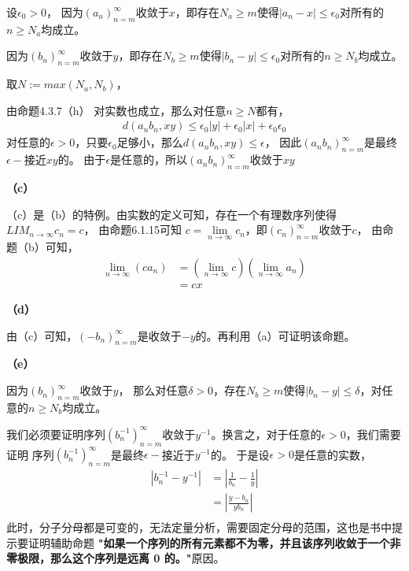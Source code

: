 \documentclass{article}
\theoremstyle{mystyle}
\begin{document}
设$\epsilon_0> 0$，
因为$(a_n)_{n=m}^\infty$收敛于$x$，即存在$N_a \geq m$使得$|a_n - x| \leq \epsilon _0$对所有的$n \geq N_a$均成立。

因为$(b_n)_{n=m}^\infty$收敛于$y$，即存在$N_b \geq m$使得$|b_n - y| \leq \epsilon _0$对所有的$n \geq N_b$均成立。

取$N := max(N_a, N_b)$，

由命题4.3.7（h） 对实数也成立，那么对任意$n \geq N$都有，
\begin{align*}
  d(a_nb_n,xy) \leq \epsilon_0|y| + \epsilon_0|x| + \epsilon_0\epsilon_0
\end{align*}
对任意的$\epsilon > 0$，只要$\epsilon_0$足够小，那么$d(a_nb_n,xy)\leq \epsilon$，
因此$(a_nb_n)_{n=m}^\infty$是最终$\epsilon -$接近$xy$的。
由于$\epsilon$是任意的，所以$(a_nb_n)_{n=m}^\infty$收敛于$xy$


\textbf{（c）}

（c）是（b）的特例。由实数的定义可知，存在一个有理数序列使得$LIM_{n\rightarrow\infty}c_n = c$，
由命题6.1.15可知 $c = \lim\limits_{n \rightarrow \infty}c_n$，即$(c_n)_{n=m}^\infty$收敛于$c$，
由命题（b）可知，
\begin{align*}
  \lim\limits_{n\rightarrow \infty}(ca_n) & = (\lim\limits_{n\rightarrow \infty}c) (\lim\limits_{n\rightarrow \infty}a_n) \\
                                          & = cx
\end{align*}

\textbf{（d）}

由（c）可知，$(-b_n)_{n=m}^\infty$是收敛于$-y$的。再利用（a）可证明该命题。


\textbf{（e）}

因为$(b_n)_{n=m}^\infty$收敛于$y$，
那么对任意$\delta > 0$，存在$N_b \geq m$使得$|b_n - y| \leq \delta$，对任意的$n \geq N_b$均成立。

我们必须要证明序列$(b_n^{-1})_{n=m}^\infty$收敛于$y^{-1}$。换言之，对于任意的$\epsilon > 0$，我们需要证明
序列$(b_n^{-1})_{n=m}^\infty$是最终$\epsilon -$接近于$y^{-1}$的。
于是设$\epsilon > 0$是任意的实数，
\begin{align*}
  |b_n^{-1} - y^{-1}| & = \left| \frac{1}{b_n} - \frac{1}{y} \right| \\
                      & = \left| \frac{y - b_n}{yb_n} \right|        \\
\end{align*}
此时，分子分母都是可变的，无法定量分析，需要固定分母的范围，这也是书中提示要证明辅助命题
\textbf{"如果一个序列的所有元素都不为零，并且该序列收敛于一个非零极限，那么这个序列是远离 0 的。"}原因。
\end{document}
